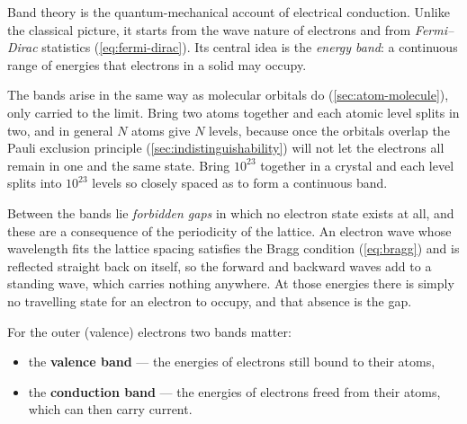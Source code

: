     Band theory is the quantum-mechanical account of electrical conduction. Unlike the classical picture, it starts from the wave nature of electrons and from \emph{Fermi--Dirac} statistics (\cref{eq:fermi-dirac}). Its central idea is the \emph{energy band}: a continuous range of energies that electrons in a solid may occupy.

    The bands arise in the same way as molecular orbitals do (\cref{sec:atom-molecule}), only carried to the limit. Bring two atoms together and each atomic level splits in two, and in general $N$ atoms give $N$ levels, because once the orbitals overlap the Pauli exclusion principle (\cref{sec:indistinguishability}) will not let the electrons all remain in one and the same state. Bring $10^{23}$ together in a crystal and each level splits into $10^{23}$ levels so closely spaced as to form a continuous band.

    Between the bands lie \emph{forbidden gaps} in which no electron state exists at all, and these are a consequence of the periodicity of the lattice. An electron wave whose wavelength fits the lattice spacing satisfies the Bragg condition (\cref{eq:bragg}) and is reflected straight back on itself, so the forward and backward waves add to a standing wave, which carries nothing anywhere. At those energies there is simply no travelling state for an electron to occupy, and that absence is the gap.

    For the outer (valence) electrons two bands matter:

    \begin{itemize}
        \item the \textbf{valence band} --- the energies of electrons still bound to their atoms,
        \item the \textbf{conduction band} --- the energies of electrons freed from their atoms, which can then carry current.
    \end{itemize}

